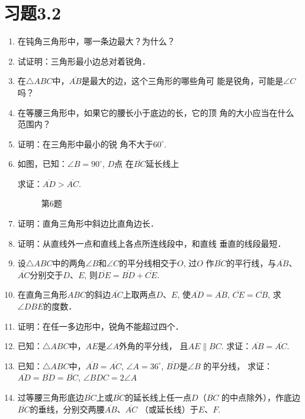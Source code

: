 \section*{习题3.2}
\begin{enumerate}
    \item 在钝角三角形中，哪一条边最大？为什么？
    \item 试证明：三角形最小边总对着锐角．
    \item 在$\triangle ABC$中，$\overline{AB}$是最大的边，这个三角形的哪些角可
    能是锐角，可能是$\angle C$吗？

    \item    在等腰三角形中，如果它的腰长小于底边的长，它的顶
    角的大小应当在什么范围内？
    \item 证明：在三角形中最小的锐
    角不大于$60^{\circ}$.
    \item 如图，已知：$\angle B=90^{\circ}$, $D$点
    在$\overline{BC}$延长线上

    求证：$\overline{AD}>\overline{AC}$.

\begin{figure}[htp]
    \centering
{}
    \caption*{第6题}
\end{figure}

    \item 证明：直角三角形中斜边比直角边长．
    \item 证明：从直线外一点和直线上各点所连线段中，和直线
    垂直的线段最短．
    \item 设$\triangle ABC$中的两角$\angle B$和$\angle C$的平分线相交于$O$, 过$O$
    作$\overline{BC}$的平行线，与$\overline{AB}$、$\overline{AC}$分别交于$D$、$E$, 则$\overline{DE}=
    \overline{BD}+\overline{CE}$.
    \item 在直角三角形$ABC$的斜边$\overline{AC}$上取两点$D$、$E$, 使$\overline{AD}=\overline{AB}$, $\overline{CE}=\overline{CB}$, 求$\angle DBE$的度数．
    \item 证明：在任一多边形中，锐角不能超过四个．
    \item 已知：$\triangle ABC$中，$AE$是$\angle A$外角的平分线，
    且$AE\parallel BC$. 
    求证：$\overline{AB}=\overline{AC}$.
    \item 已知：$\triangle ABC$中，$\overline{AB}=\overline{AC}$, $\angle A=36^{\circ}$, $\overline{BD}$是$\angle B$
    的平分线，
    求证：$\overline{AD}=\overline{BD}=\overline{BC}$, $\angle BDC=2\angle A$
    \item 过等腰三角形底边$\overline{BC}$上或$\overline{BC}$的延长线上任一点$D$（$\overline{BC}$
    的中点除外），作底边$\overline{BC}$的垂线，分别交两腰$\overline{AB}$、$\overline{AC}$
    （或延长线）于$E$、$F$. 


\end{enumerate}
